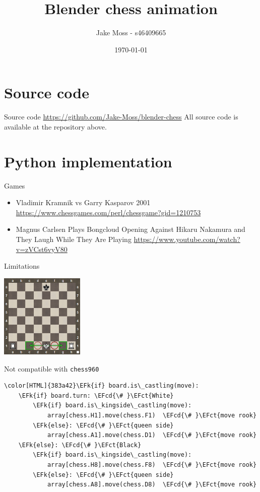 \documentclass[presentation, 8pt]{beamer}
\author{Jake Moss - s46409665}
\date{\today}
\title{Blender chess animation}
\newcommand{\EFk}[1]{\textcolor{EFk}{#1}} %
\newcommand{\EFct}[1]{\textcolor{EFct}{#1}} %
\newcommand{\EFcd}[1]{\textcolor{EFcd}{#1}} %
\begin{document}
\maketitle
\section{Source code}
\label{sec:orgb6968e7}
\begin{frame}[label={sec:orgfd678ee}]{Source code}
\url{https://github.com/Jake-Moss/blender-chess}
All source code is available at the repository above.
\end{frame}
\section{Python implementation}
\label{sec:orge6d4baf}
\begin{frame}[label={sec:org536a68d}]{Games}
\begin{itemize}
\item Vladimir Kramnik vs Garry Kasparov 2001
\url{https://www.chessgames.com/perl/chessgame?gid=1210753}
\end{itemize}



\begin{itemize}
\item Magnus Carlsen Plays Bongcloud Opening Against Hikaru Nakamura and They Laugh While They Are Playing
\url{https://www.youtube.com/watch?v=zVCst6vyV80}
\end{itemize}
\end{frame}
\begin{frame}[label={sec:org9485e80},fragile]{Limitations}
 \begin{center}
\includegraphics[width=0.3\textwidth]{Images/Possible-castling-moves.png}
\end{center}
\alert{Not} compatible with \texttt{chess960}
\begin{Code}
\begin{Verbatim}[]
\color[HTML]{383a42}\EFk{if} board.is\_castling(move):
    \EFk{if} board.turn: \EFcd{\# }\EFct{White}
        \EFk{if} board.is\_kingside\_castling(move):
            array[chess.H1].move(chess.F1)  \EFcd{\# }\EFct{move rook}
        \EFk{else}: \EFcd{\# }\EFct{queen side}
            array[chess.A1].move(chess.D1)  \EFcd{\# }\EFct{move rook}
    \EFk{else}: \EFcd{\# }\EFct{Black}
        \EFk{if} board.is\_kingside\_castling(move):
            array[chess.H8].move(chess.F8)  \EFcd{\# }\EFct{move rook}
        \EFk{else}: \EFcd{\# }\EFct{queen side}
            array[chess.A8].move(chess.D8)  \EFcd{\# }\EFct{move rook}
\end{Verbatim}
\end{Code}
\end{frame}
\end{document}
